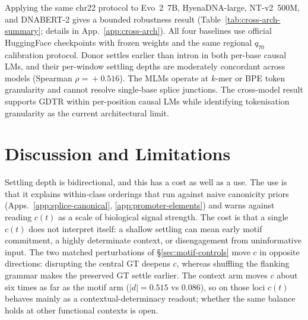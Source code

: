 \documentclass{article}
\theoremstyle{plain}
\theoremstyle{definition}
\theoremstyle{remark}
\newcommand{\gDTR}{\textsc{GDTR}}
\begin{document}
Applying the same chr22 protocol to Evo~2~7B, HyenaDNA-large, NT-v2~500M, and DNABERT-2 gives a bounded robustness result (Table~\ref{tab:cross-arch-summary}; details in App.~\ref{app:cross-arch}). All four baselines use official HuggingFace checkpoints with frozen weights and the same regional $q_{70}$ calibration protocol. Donor settles earlier than intron in both per-base causal LMs, and their per-window settling depths are moderately concordant across models (Spearman $\rho\!=\!+0.516$). The MLMs operate at $k$-mer or BPE token granularity and cannot resolve single-base splice junctions. The cross-model result supports \gDTR{} within per-position causal LMs while identifying tokenisation granularity as the current architectural limit.

\begin{table}[t]
  \caption{Cross-model summary. Full per-window numbers and MLM tokenisation notes are in App.~\ref{app:cross-arch}.}
  \label{tab:cross-arch-summary}
  \centering
  \footnotesize
  \setlength{\tabcolsep}{4pt}
\end{table}

\section{Discussion and Limitations}
\label{sec:discussion}

Settling depth is bidirectional, and this has a cost as well as a use. The use is that it explains within-class orderings that run against naive canonicity priors (Apps.~\ref{app:splice-canonical}, \ref{app:promoter-elements}) and warns against reading $c(t)$ as a scale of biological signal strength. The cost is that a single $c(t)$ does not interpret itself: a shallow settling can mean early motif commitment, a highly determinate context, or disengagement from uninformative input. The two matched perturbations of \S\ref{sec:motif-controls} move $c$ in opposite directions: disrupting the central GT deepens $c$, whereas shuffling the flanking grammar makes the preserved GT settle earlier. The context arm moves $c$ about six times as far as the motif arm ($|d|\!=\!0.515$ vs $0.086$), so on those loci $c(t)$ behaves mainly as a contextual-determinacy readout; whether the same balance holds at other functional contexts is open.
\end{document}
